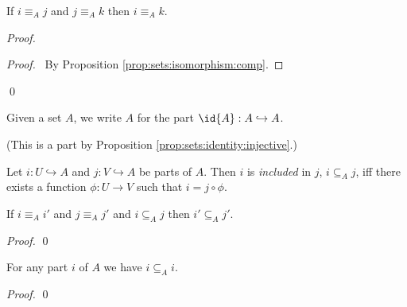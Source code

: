 \begin{prop}
  If $i \equiv_A j$ and $j \equiv_A k$ then $i \equiv_A k$.
\end{prop}

\begin{proof}
  \pf
  \begin{proof}
    \pf\ By Proposition \ref{prop:sets:isomorphism:comp}.
  \end{proof}
\qed
\end{proof}

\begin{df}
  Given a set $A$, we write $A$ for the part $\id{A} : A \hookrightarrow A$.
\end{df}

(This is a part by Proposition \ref{prop:sets:identity:injective}.)

\begin{df}[Inclusion]
 Let $i : U \hookrightarrow A$ and $j : V \hookrightarrow A$ be parts of $A$.
 Then $i$ is \emph{included} in $j$, $i \subseteq_A j$, iff there exists a
 function $\phi : U \rightarrow V$ such that $i = j \circ \phi$.
\end{df}

\begin{prop}
  If $i \equiv_A i'$ and $j \equiv_A j'$ and $i \subseteq_A j$ then $i' \subseteq_A j'$.
\end{prop}

\begin{proof}
  \pf
  \qed
\end{proof}

\begin{prop}
  For any part $i$ of $A$ we have $i \subseteq_A i$.
\end{prop}

\begin{proof}
  \pf
  \qed
\end{proof}

